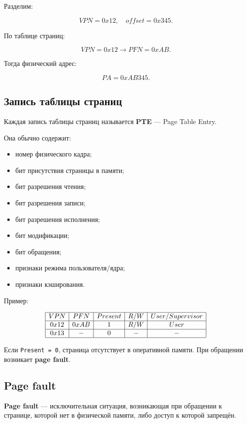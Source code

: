 \documentclass[12pt,a4paper]{article}
\theoremstyle{remark}
\begin{document}
Разделим:

\[
VPN = 0x12,
\quad
offset = 0x345.
\]

По таблице страниц:

\[
VPN = 0x12 \longrightarrow PFN = 0xAB.
\]

Тогда физический адрес:

\[
PA = 0xAB345.
\]

\subsection{Запись таблицы страниц}

Каждая запись таблицы страниц называется \textbf{PTE} --- Page Table Entry.

Она обычно содержит:
\begin{itemize}
    \item номер физического кадра;
    \item бит присутствия страницы в памяти;
    \item бит разрешения чтения;
    \item бит разрешения записи;
    \item бит разрешения исполнения;
    \item бит модификации;
    \item бит обращения;
    \item признаки режима пользователя/ядра;
    \item признаки кэширования.
\end{itemize}

Пример:

\[
\begin{array}{|c|c|c|c|c|}
\hline
VPN & PFN & Present & R/W & User/Supervisor \\
\hline
0x12 & 0xAB & 1 & R/W & User \\
\hline
0x13 & - & 0 & - & - \\
\hline
\end{array}
\]

Если \texttt{Present = 0}, страница отсутствует в оперативной памяти. При обращении возникает \textbf{page fault}.

\subsection{Page fault}

\textbf{Page fault} --- исключительная ситуация, возникающая при обращении к странице, которой нет в физической памяти, либо доступ к которой запрещён.
\end{document}
